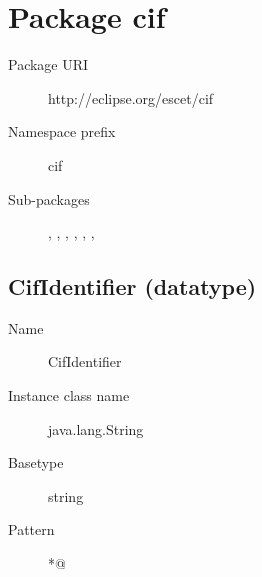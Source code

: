 

\section{Package cif}\label{cifpkg:cif}
\pkgdocucif

\begin{description}
\item[Package URI] http://eclipse.org/escet/cif
\item[Namespace prefix] cif
\item[Sub-packages] , , , , , , 
\end{description}

\subsection{CifIdentifier (datatype)}\label{cifclass:CifIdentifier}
\dtypedocuCifIdentifier

\begin{description}
\item[Name] CifIdentifier
\item[Instance class name] java.lang.String
\item[Basetype] string
\item[Pattern] \verb@[A-Za-z_][A-Za-z0-9_]*@
\end{description}

